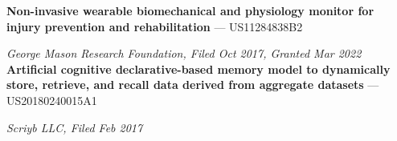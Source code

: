 
\textbf{Non-invasive wearable biomechanical and physiology monitor for injury prevention and rehabilitation} --- US11284838B2

\textit{George Mason Research Foundation, Filed Oct 2017, Granted Mar 2022} \\

\textbf{Artificial cognitive declarative-based memory model to dynamically store, retrieve, and recall data derived from aggregate datasets } --- US20180240015A1

\textit{Scriyb LLC, Filed Feb 2017} \\

